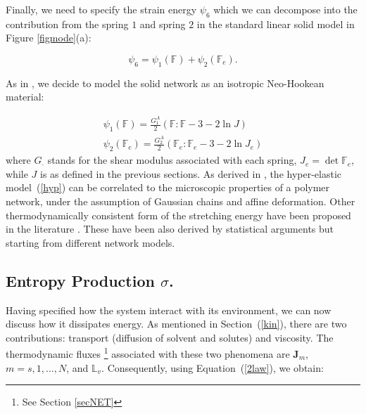 \documentclass[runningheads]{llncs}
\newcommand{\F}{\ensuremath{\mathbb{F}}}
\newcommand{\LL}{\ensuremath{\mathbb{L}}}
\begin{document}
Finally, we need to specify the strain energy $\psi_6$ which we can decompose into the contribution from the spring $1$ and spring $2$ in the standard linear solid model in Figure \ref{figmode}(a):

\begin{equation}
\psi_6 = \psi_1(\F) + \psi_2(\F_e).
\end{equation}

As in \cite{ecm2}, we decide to model the solid network as an isotropic  Neo-Hookean material:

\begin{eqnarray}
\psi_1(\F) = \frac{G^A_1}{2} \left(\F:\F - 3 -2 \ln J\right)\\
\psi_2(\F_e) = \frac{G^A_2}{2} \left(\F_e:\F_e - 3 -2 \ln J_{e}\right)\label{hyp}
\end{eqnarray}
where $G_\mathbf{\cdot}$ stands for the shear modulus associated with each spring, $J_e= \det \F_e$, while $J$ is as defined in the previous sections. As derived in \cite{floryprinciples}, the hyper-elastic model~(\ref{hyp}) can be correlated to the microscopic properties of a polymer network, under the assumption of Gaussian chains and affine deformation. Other thermodynamically consistent form of the stretching energy have been proposed in the literature \cite{BERGSTROM1998931,boyce2,doi}. These have been also derived by statistical arguments but starting from different network models.

\subsection{Entropy Production $\sigma$.}
\label{ent}

Having specified how the system interact with its environment, we can now discuss how it dissipates energy. As mentioned in Section~(\ref{kin}), there are two contributions: transport (diffusion of solvent and solutes) and viscosity. The thermodynamic fluxes \footnote{See Section \ref{secNET}} associated with these two phenomena are $\mathbf{J}_m$, $m=s,1,\ldots,N$, and $\LL_v$. Consequently, using Equation~(\ref{2law}), we obtain:
\end{document}
